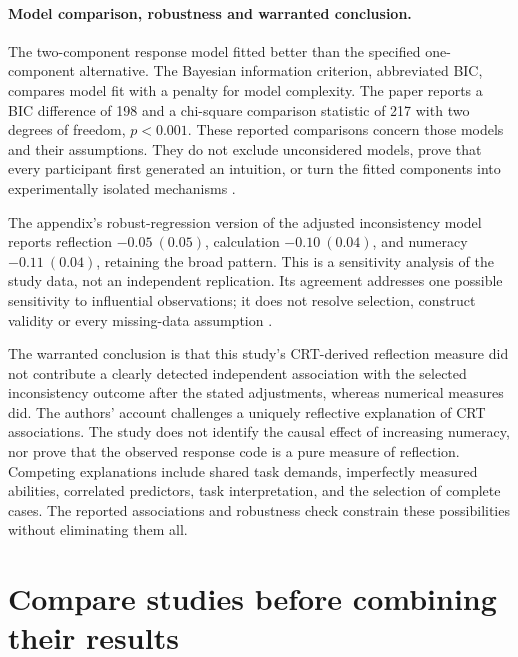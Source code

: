 \paragraph{Model comparison, robustness and warranted conclusion.}
The two-component response model fitted better than the specified one-component
alternative. The Bayesian information criterion, abbreviated BIC, compares
model fit with a penalty for model complexity. The paper reports a BIC
difference of 198 and a chi-square comparison statistic of 217 with two degrees
of freedom, \(p<0.001\). These reported comparisons concern those
models and their assumptions. They do not exclude unconsidered models, prove
that every participant first generated an intuition, or turn the fitted
components into experimentally isolated mechanisms
\cite[p.~5]{SinayevPeters2015Calculation}.

The appendix's robust-regression version of the adjusted inconsistency model
reports reflection \(-0.05\ (0.05)\), calculation \(-0.10\ (0.04)\), and
numeracy \(-0.11\ (0.04)\), retaining the broad pattern. This is a sensitivity
analysis of the study data, not an independent replication. Its agreement
addresses one possible sensitivity to influential observations; it does not
resolve selection, construct validity or every missing-data assumption
\cite[appendix, table~A1, p.~16]{SinayevPeters2015Calculation}.

The warranted conclusion is that this study's CRT-derived reflection measure
did not contribute a clearly detected independent association with the selected
inconsistency outcome after the stated adjustments, whereas numerical measures
did. The authors' account challenges a uniquely reflective explanation of CRT
associations. The study does not identify the causal effect of increasing
numeracy, nor prove that the observed response code is a pure measure of
reflection. Competing explanations include shared task demands, imperfectly
measured abilities, correlated predictors, task interpretation, and the
selection of complete cases. The reported associations and robustness check
constrain these possibilities without eliminating them all.

\section{Compare studies before combining their results}
\label{sec:p19-comparability-and-replication}

